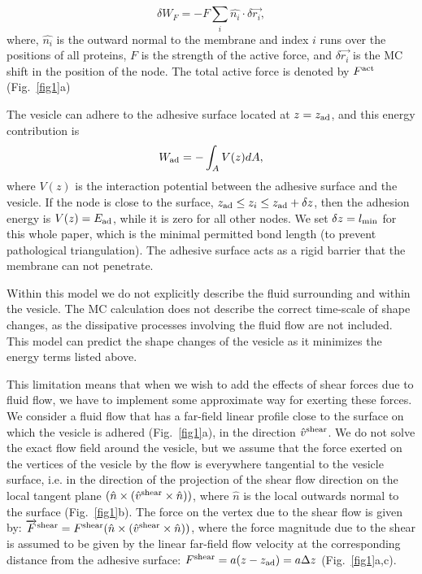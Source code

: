 \documentclass[
reprint,
superscriptaddress,
 amsmath,amssymb,
 aps,
prl,
floatfix]{revtex4-2}
\begin{document}
\begin{equation}
    \delta W_F=-F\sum_i \hat{n_i}\cdot \delta\overrightarrow{r_i},
    \label{eq:active_energy}
\end{equation}
where, $\hat{n_i}$ is the outward normal to the membrane and index $i$ runs over the positions of all proteins, $F$ is the strength of the active force, and $\delta\overrightarrow{r_i}$ is the MC shift in the position of the node. The total active force is denoted by $F^{\rm act}$ (Fig.~\ref{fig1}a)

The vesicle can adhere to the adhesive surface located at $z=z_{\rm ad}$, and this energy contribution is
\begin{equation}
    W_{\rm ad}=-\int_A V(z) dA,
    \label{eq:adhesive_energy}
\end{equation}
where $V(z)$ is the interaction potential between the adhesive surface and the vesicle. If the node is close to the surface, $z_{\rm ad}\leq z_i \leq z_{\rm ad}+\delta z$, then the adhesion energy is $V(z)=E_{\rm ad}$, while it is zero for all other nodes. We set $\delta z=l_{\rm min}$ for this whole paper, which is the minimal permitted bond length (to prevent pathological triangulation). The adhesive surface acts as a rigid barrier that the membrane can not penetrate.

Within this model we do not explicitly describe the fluid surrounding and within the vesicle. The MC calculation does not describe the correct time-scale of shape changes, as the dissipative processes involving the fluid flow are not included. This model can predict the shape changes of the vesicle as it minimizes the energy terms listed above. 

This limitation means that when we wish to add the effects of shear forces due to fluid flow, we have to implement some approximate way for exerting these forces. We consider a fluid flow that has a far-field linear profile close to the surface on which the vesicle is adhered (Fig.~\ref{fig1}a), in the direction $\hat{v}^{\rm shear}$. We do not solve the exact flow field around the vesicle, but we assume that the force exerted on the vertices of the vesicle by the flow is everywhere tangential to the vesicle surface, i.e. in the direction of the projection of the shear flow direction on the local tangent plane $(\hat{n}\times (\hat{v}^{\rm shear}\times \hat{n}))$, where $\hat{n}$ is the local outwards normal to the surface (Fig.~\ref{fig1}b). The force on the vertex due to the shear flow is given by: $\overrightarrow{F}^{\rm shear}=F^{\rm shear} (\hat{n}\times (\hat{v}^{\rm shear}\times \hat{n}))$, where the force magnitude due to the shear is assumed to be given by the linear far-field flow velocity at the corresponding distance from the adhesive surface:  $F^{\rm shear}=a(z-z_{\rm ad})=a\Delta z$ (Fig.~\ref{fig1}a,c).
\end{document}
